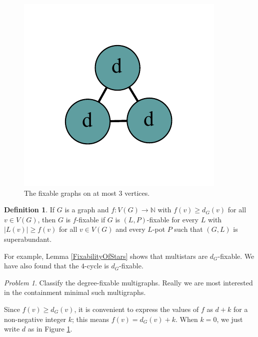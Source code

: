 \documentclass[12pt]{article}
\theoremstyle{plain}
\theoremstyle{definition}
\newtheorem{defn}{Definition}
\theoremstyle{remark}
\newtheorem*{problem}{Problem}
\newcommand{\IN}{\mathbb{N}}
\newcommand{\func}[3]{#1\colon #2 \rightarrow #3}
\begin{document}
\begin{figure}[htb]
		\includegraphics[scale=0.5]{Superabundance/all/111[2,2,2].pdf}
		\caption{The fixable graphs on at most 3 vertices.}
		\label{fig:fixable3}
	\end{figure}
	
	\begin{defn}
		If $G$ is a graph and $\func{f}{V(G)}{\IN}$ with $f(v) \ge d_G(v)$ for all $v \in V(G)$, then $G$ is $f$-fixable if $G$ is $(L, P)$-fixable for every $L$ with $|L(v)| \ge f(v)$ for all $v \in V(G)$ and every $L$-pot $P$ such that $(G,L)$ is superabundant.
	\end{defn}
	
	For example, Lemma \ref{FixabilityOfStars} shows that multistars are $d_G$-fixable.  We have also found that the $4$-cycle is $d_G$-fixable.
	
	\begin{problem}
	Classify the degree-fixable multigraphs.  Really we are most interested in the containment minimal such multigraphs.
	\end{problem} 
	
	Since $f(v) \ge d_G(v)$, it is convenient to express the values of $f$ as $d+k$ for a non-negative integer $k$; this means $f(v) = d_G(v) + k$.  When $k=0$, we just write $d$ as in Figure \ref{fig:fixable3}.  
	
\end{document}
